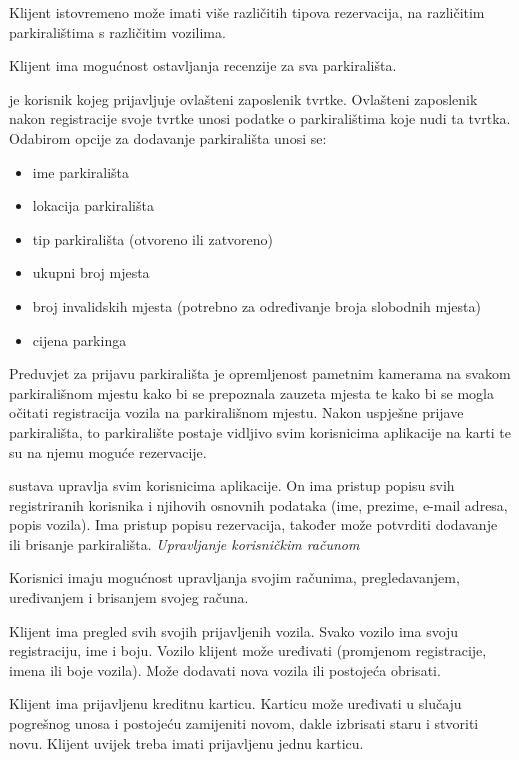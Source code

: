 Klijent istovremeno može imati više različitih tipova rezervacija, na različitim parkiralištima s različitim vozilima.

Klijent ima mogućnost ostavljanja recenzije za sva parkirališta.
\newline

\textit{} je korisnik kojeg prijavljuje ovlašteni zaposlenik tvrtke. Ovlašteni zaposlenik nakon registracije svoje tvrtke unosi podatke o parkiralištima koje nudi ta tvrtka. Odabirom opcije za dodavanje parkirališta unosi se:
\begin{itemize}
    \item ime parkirališta
    \item lokacija parkirališta
    \item tip parkirališta (otvoreno ili zatvoreno)
    \item ukupni broj mjesta 
    \item broj invalidskih mjesta (potrebno za određivanje broja slobodnih mjesta)
    \item cijena parkinga
\end{itemize}
 Preduvjet za prijavu parkirališta je opremljenost pametnim kamerama na svakom parkirališnom mjestu kako bi se prepoznala zauzeta mjesta te kako bi se mogla očitati registracija vozila na parkirališnom mjestu. Nakon uspješne prijave parkirališta, to parkiralište postaje vidljivo svim korisnicima aplikacije na karti te su na njemu moguće rezervacije.
\newline

\textit{} sustava upravlja svim korisnicima aplikacije. On ima pristup popisu svih registriranih korisnika i njihovih osnovnih podataka (ime, prezime, e-mail adresa, popis vozila). Ima pristup popisu rezervacija,
također može potvrditi dodavanje ili brisanje parkirališta.
\newpage\textit{Upravljanje korisničkim računom}

Korisnici imaju mogućnost upravljanja svojim računima, pregledavanjem, uređivanjem i brisanjem svojeg računa.

Klijent ima pregled svih svojih prijavljenih vozila. Svako vozilo ima svoju registraciju, ime i boju. Vozilo klijent može uređivati (promjenom registracije, imena ili boje vozila). Može dodavati nova vozila ili postojeća obrisati. 

Klijent ima prijavljenu kreditnu karticu. Karticu može uređivati u slučaju pogrešnog unosa i postojeću zamijeniti novom, dakle izbrisati staru i stvoriti novu. Klijent uvijek treba imati prijavljenu jednu karticu.

